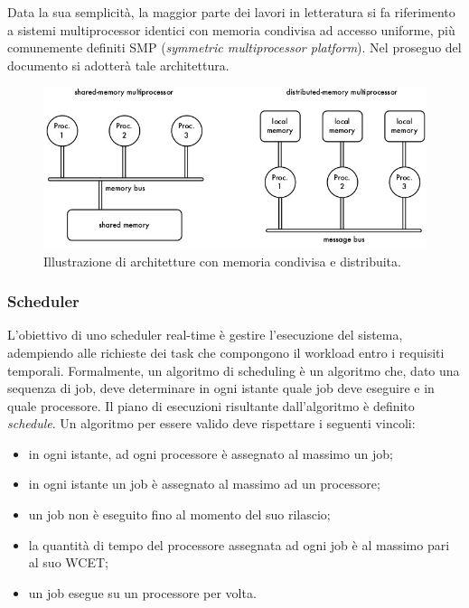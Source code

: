 Data la sua semplicità, la maggior parte dei lavori in letteratura si fa riferimento a sistemi multiprocessor identici con memoria condivisa ad accesso uniforme, più comunemente definiti SMP (\textit{symmetric multiprocessor platform}). Nel proseguo del documento si adotterà tale architettura.

\begin{figure}
\includegraphics[width=\linewidth]{images/memory_arch.jpeg}
\caption{Illustrazione di architetture con memoria condivisa e distribuita.}
\label{fig:memory}
\end{figure}

\subsubsection{Scheduler}
\label{sec:overviewSCHED}

L'obiettivo di uno scheduler real-time è gestire l'esecuzione del sistema, adempiendo alle richieste dei task che compongono il workload entro i requisiti temporali. Formalmente, un algoritmo di scheduling è un algoritmo che, dato una sequenza di job, deve determinare in ogni istante quale job deve eseguire e in quale processore. Il piano di esecuzioni risultante dall'algoritmo è definito \textit{schedule}. Un algoritmo per essere valido deve rispettare i seguenti vincoli:\\

\begin{itemize}
	\item in ogni istante, ad ogni processore è assegnato al massimo un job; 
	\item in ogni istante un job è assegnato al massimo ad un processore;
	\item un job non è eseguito fino al momento del suo rilascio;
	\item la quantità di tempo del processore assegnata ad ogni job è al massimo pari al suo WCET;
	\item un job esegue su un processore per volta.
\end{itemize}

